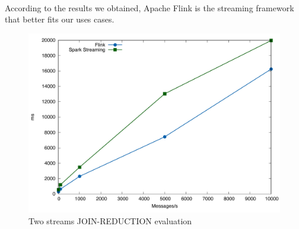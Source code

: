 \paragraph{}
According to the results we obtained, Apache Flink is the streaming framework that better fits our uses cases. 

 \begin{figure}[h!]
\includegraphics[width=1\textwidth]{images/join_cropped.pdf}
 \caption{Two streams JOIN-REDUCTION evaluation}
\label{fig:results_join}
\end{figure}



